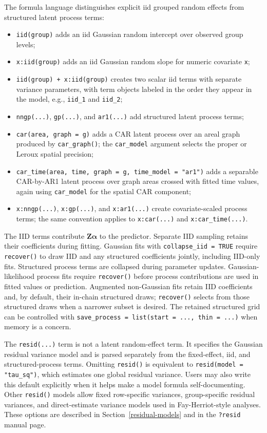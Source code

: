 \documentclass[11pt]{article}
\newcommand{\balpha}{\bm{\alpha}}
\newcommand{\bZ}{\bm{Z}}
\begin{document}
The formula language distinguishes explicit iid grouped random effects from structured latent process terms:
\begin{itemize}
\item \texttt{iid(group)} adds an iid Gaussian random intercept over observed group levels;
\item \texttt{x:iid(group)} adds an iid Gaussian random slope for numeric covariate \texttt{x};
\item \texttt{iid(group) + x:iid(group)} creates two scalar iid terms with separate variance parameters, with term objects labeled in the order they appear in the model, e.g., \texttt{iid\_1} and \texttt{iid\_2};
\item \texttt{nngp(...)}, \texttt{gp(...)}, and \texttt{ar1(...)} add structured latent process terms;
\item \texttt{car(area, graph = g)} adds a CAR latent process over an areal graph produced by \texttt{car\_graph()}; the \texttt{car\_model} argument selects the proper or Leroux spatial precision;
\item \texttt{car\_time(area, time, graph = g, time\_model = "ar1")} adds a separable CAR-by-AR1 latent process over graph areas crossed with fitted time values, again using \texttt{car\_model} for the spatial CAR component;
\item \texttt{x:nngp(...)}, \texttt{x:gp(...)}, and \texttt{x:ar1(...)} create covariate-scaled process terms; the same convention applies to \texttt{x:car(...)} and \texttt{x:car\_time(...)}.
\end{itemize}

The IID terms contribute $\bZ\balpha$ to the predictor. Separate IID sampling retains their coefficients during fitting. Gaussian fits with \texttt{collapse\_iid = TRUE} require \texttt{recover()} to draw IID and any structured coefficients jointly, including IID-only fits. Structured process terms are collapsed during parameter updates. Gaussian-likelihood process fits require \texttt{recover()} before process contributions are used in fitted values or prediction. Augmented non-Gaussian fits retain IID coefficients and, by default, their in-chain structured draws; \texttt{recover()} selects from those structured draws when a narrower subset is desired. The retained structured grid can be controlled with \texttt{save\_process = list(start = ..., thin = ...)} when memory is a concern.

The \texttt{resid(...)} term is not a latent random-effect term. It specifies the Gaussian residual variance model and is parsed separately from the fixed-effect, iid, and structured-process terms. Omitting \texttt{resid()} is equivalent to \texttt{resid(model = "tau\_sq")}, which estimates one global residual variance. Users may also write this default explicitly when it helps make a model formula self-documenting. Other \texttt{resid()} models allow fixed row-specific variances, group-specific residual variances, and direct-estimate variance models used in Fay-Herriot-style analyses. These options are described in Section~\ref{residual-models} and in the \texttt{?resid} manual page.
\end{document}
